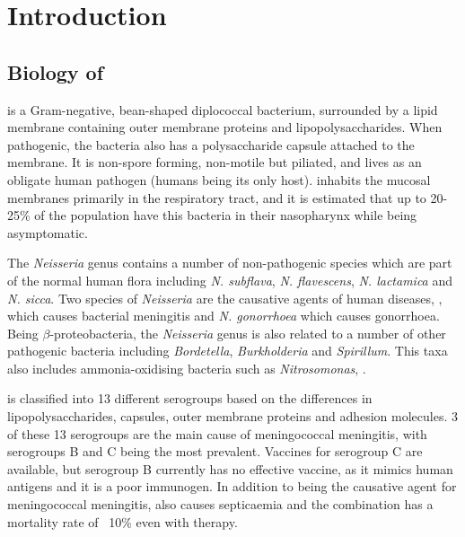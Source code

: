 \chapter{Introduction}
\label{chap:intro}

\section{Biology of \Nsm{}}
\Nsm{} is a Gram-negative, bean-shaped diplococcal bacterium\cite{Deuren2000}, surrounded by a lipid membrane containing outer membrane proteins and lipopolysaccharides\cite{Deuren2000}. When pathogenic, the bacteria also has a polysaccharide capsule attached to the membrane\cite{Deuren2000}. It is non-spore forming, non-motile but piliated, and lives as an obligate human pathogen (humans being its only host)\cite{Stephens2009}. \Nm{} inhabits the mucosal membranes primarily in the respiratory tract, and it is estimated that up to 20-25\% of the population have this bacteria in their nasopharynx while being asymptomatic\cite{Rosenstein2001,Stephens2009,DeVoe1982}.

The \textit{Neisseria} genus contains a number of non-pathogenic species which are part of the normal human flora including \textit{N. subflava},  \textit{N. flavescens},  \textit{N. lactamica} and \textit{N. sicca}\cite{Aas2005}. Two species of \textit{Neisseria} are the causative agents of human diseases, \Nm{}, which causes bacterial meningitis and \textit{N. gonorrhoea} which causes gonorrhoea. Being $\beta$-proteobacteria\cite{Stephens2009}, the \textit{Neisseria} genus is also related to a number of other pathogenic bacteria including \textit{Bordetella}, \textit{Burkholderia} and \textit{Spirillum}. This taxa also includes ammonia-oxidising bacteria such as \textit{Nitrosomonas}\cite{Madigan2005}, .

\Nm{} is classified into 13 different serogroups based on the differences in lipopolysaccharides, capsules, outer membrane proteins and adhesion molecules\cite{Stephens2009,Deuren2000,Carbonnelle2009}. 3 of these 13 serogroups are the main cause of meningococcal meningitis, with serogroups B and C being the most prevalent\cite{Deuren2000}. Vaccines for serogroup C are available, but serogroup B currently has no effective vaccine, as it mimics human antigens\cite{Stephens2009} and it is a poor immunogen\cite{Stephens2007}. In addition to being the causative agent for meningococcal meningitis, \Nm{} also causes septicaemia and the combination has a mortality rate of ~10\% even with therapy\cite{Deuren2000,Stephens2009}.

